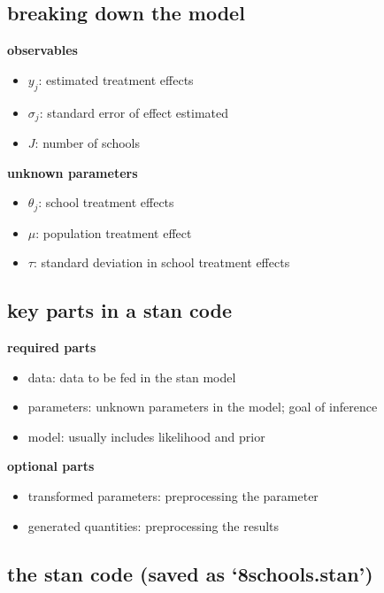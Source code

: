 \documentclass[]{article}
\providecommand{\tightlist}{%
  \setlength{\itemsep}{0pt}\setlength{\parskip}{0pt}}
\begin{document}
\subsection{breaking down the model}\label{breaking-down-the-model}

\textbf{observables}

\begin{itemize}
\tightlist
\item
  \(y_j\): estimated treatment effects
\item
  \(\sigma_j\): standard error of effect estimated
\item
  \(J\): number of schools
\end{itemize}

\textbf{unknown parameters}

\begin{itemize}
\tightlist
\item
  \(\theta_j\): school treatment effects
\item
  \(\mu\): population treatment effect
\item
  \(\tau\): standard deviation in school treatment effects
\end{itemize}

\subsection{key parts in a stan code}\label{key-parts-in-a-stan-code}

\textbf{required parts}

\begin{itemize}
\tightlist
\item
  data: data to be fed in the stan model
\item
  parameters: unknown parameters in the model; goal of inference
\item
  model: usually includes likelihood and prior
\end{itemize}

\textbf{optional parts}

\begin{itemize}
\tightlist
\item
  transformed parameters: preprocessing the parameter
\item
  generated quantities: preprocessing the results
\end{itemize}

\subsection{\texorpdfstring{the stan code (saved as
`8schools.stan')}{the stan code (saved as 8schools.stan)}}\label{the-stan-code-saved-as-8schools.stan}
\end{document}
